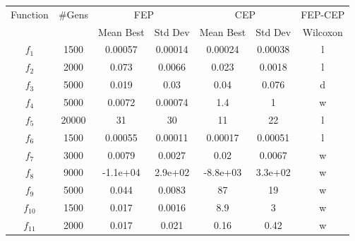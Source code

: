 \begin{table}\scriptsize
\begin{tabular}{ccccccc}
\hline
\multirow{2}{*}{Function} & \multirow{2}{*}{\#Gens}& \multicolumn{2}{c}{FEP} & \multicolumn{2}{c}{CEP} & FEP-CEP \\
 & & Mean Best & Std Dev & Mean Best & Std Dev & Wilcoxon \\
\hline
 $f_{1}$ & 1500 & 0.00057 & 0.00014 & 0.00024 & 0.00038 & l \\
 $f_{2}$ & 2000 & 0.073 & 0.0066 & 0.023 & 0.0018 & l \\
 $f_{3}$ & 5000 & 0.019 & 0.03 & 0.04 & 0.076 & d \\
 $f_{4}$ & 5000 & 0.0072 & 0.00074 & 1.4 & 1 & w \\
 $f_{5}$ & 20000 & 31 & 30 & 11 & 22 & l \\
 $f_{6}$ & 1500 & 0.00055 & 0.00011 & 0.00017 & 0.00051 & l \\
 $f_{7}$ & 3000 & 0.0079 & 0.0027 & 0.02 & 0.0067 & w \\
 $f_{8}$ & 9000 & -1.1e+04 & 2.9e+02 & -8.8e+03 & 3.3e+02 & w \\
 $f_{9}$ & 5000 & 0.044 & 0.0083 & 87 & 19 & w \\
 $f_{10}$ & 1500 & 0.017 & 0.0016 & 8.9 & 3 & w \\
 $f_{11}$ & 2000 & 0.017 & 0.021 & 0.16 & 0.42 & w \\
\hline
\end{tabular}
\end{table}

